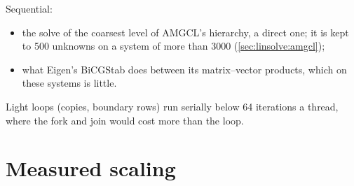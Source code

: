 Sequential:

\begin{itemize}
  \item the solve of the coarsest level of AMGCL's hierarchy, a direct one;
    it is kept to 500 unknowns on a system of more than 3000
    (\cref{sec:linsolve:amgcl});
  \item what Eigen's BiCGStab does between its matrix--vector products,
    which on these systems is little.
\end{itemize}

Light loops (copies, boundary rows) run serially below 64 iterations a thread,
where the fork and join would cost more than the loop.

\section{Measured scaling}
\label{sec:parallel:scaling}

